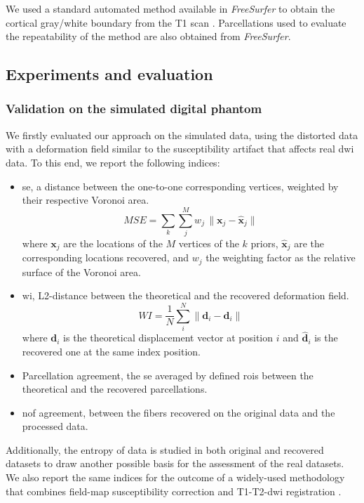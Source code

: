 We used a standard automated method
available in \emph{FreeSurfer} \citep{fischl_freesurfer_2012} to obtain the
cortical gray/white boundary from the T1 scan \citep{greve_accurate_2009}.
Parcellations used to evaluate the repeatability of the method are also
obtained from \emph{FreeSurfer}.


\subsection{Experiments and evaluation}
\label{sec:experiments_evaluation}
%
\subsubsection{Validation on the simulated digital phantom} %
\label{sec:validation_phantom}
We firstly evaluated our approach on the simulated data, using
the distorted data with a deformation field similar to the
susceptibility artifact that affects real \gls{dwi} data. To
this end, we report the following indices:
\begin{itemize}
\item \gls{se}, a distance between the one-to-one corresponding
vertices, weighted by their respective Voronoi area.
\begin{equation}
MSE = \sum\limits_k \sum\limits_j^M w_j\,\| \mathbf{x}_j - \hat{\mathbf{x}}_j \|
\end{equation}
where $\mathbf{x}_j$ are the locations of the $M$ vertices of the $k$ priors,
$\hat{\mathbf{x}}_j$ are the corresponding locations recovered, and $w_j$ the
weighting factor as the relative surface of the Voronoi area.
\item \gls{wi}, L2-distance between the theoretical and the recovered
deformation field.
\begin{equation}
WI = \frac{1}{N} \sum\limits_i^N \| \mathbf{d}_i - \hat{\mathbf{d}}_i \|
\end{equation}
where $\mathbf{d}_i$ is the theoretical displacement vector at position $i$
and $\hat{\mathbf{d}}_i$ is the recovered one at the same index position.
\item Parcellation agreement, the \gls{se} averaged by defined \glspl{roi}
between the theoretical and the recovered parcellations.
\item \gls{nof} agreement, between the fibers recovered on the original
data and the processed data.
\end{itemize}

Additionally, the entropy of data is studied in both
original and recovered datasets to draw another possible basis for the
assessment of the real datasets. We also report the same indices for the
outcome of a widely-used methodology that combines field-map susceptibility
correction and T1-T2-\gls{dwi} registration .

